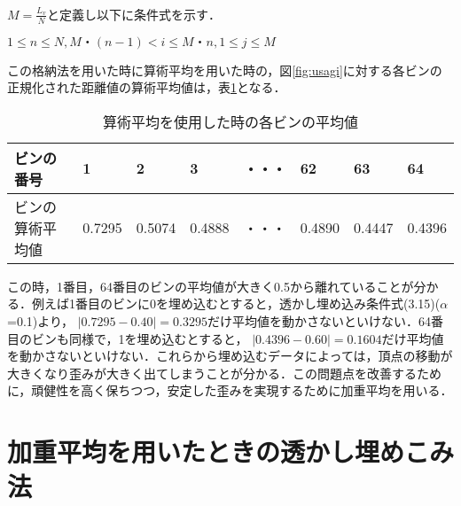 \documentclass[11pt]{jreport}
\begin{document}
{\begin{math}
 M=\frac{L_v}{N}と定義し以下に条件式を示す．
 \end{math}\par
\begin{center}
\begin{math}
1\le n \le N,M・(n-1) < i \le M・n,1\le j \le M
 \end{math}\par
\end{center}

この格納法を用いた時に算術平均を用いた時の，図\ref{fig:usagi}に対する各ビンの正規化された距離値の算術平均値は，表\ref{tab:sanzyutu}となる．


\begin{table}[h]
\begin{center}
\caption{算術平均を使用した時の各ビンの平均値}
  \begin{tabular}{|l|l|l|l|l|l|l|l|} \hline
    ビンの番号 & 1 & 2 & 3 & ・・・ & 62 & 63 & 64 \\ \hline \hline
    ビンの算術平均値 & 0.7295 & 0.5074 & 0.4888 & ・・・ & 0.4890 & 0.4447 &0.4396 \\ \hline
  \end{tabular}
\label{tab:sanzyutu}
\end{center}
\end{table}


この時，1番目，64番目のビンの平均値が大きく0.5から離れていることが分かる．例えば1番目のビンに0を埋め込むとすると，透かし埋め込み条件式(3.15)(\begin{math}\alpha\end{math}=0.1)より，
\begin{math}
|0.7295-0.40|=0.3295
\end{math}だけ平均値を動かさないといけない．64番目のビンも同様で，1を埋め込むとすると，
\begin{math}
|0.4396-0.60|=0.1604
\end{math}だけ平均値を動かさないといけない．これらから埋め込むデータによっては，頂点の移動が大きくなり歪みが大きく出てしまうことが分かる．この問題点を改善するために，頑健性を高く保ちつつ，安定した歪みを実現するために加重平均を用いる．






\section{加重平均を用いたときの透かし埋めこみ法}




}
\end{document}
